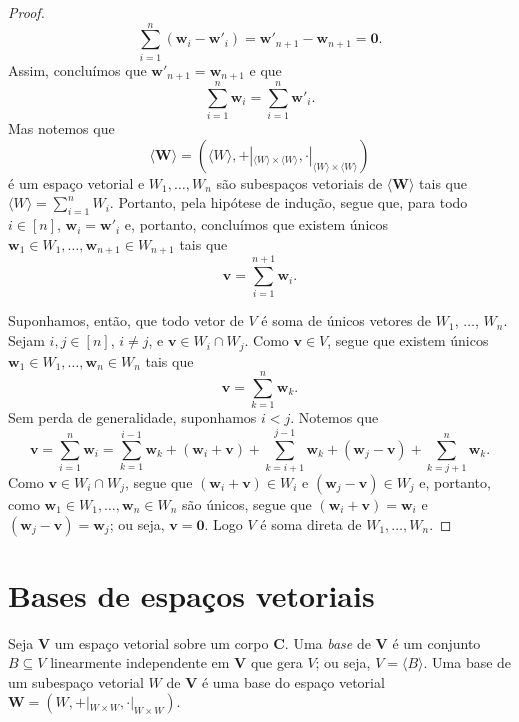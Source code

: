 \begin{proof}
\begin{equation*}
	\sum_{i=1}^n (\bm w_i - \bm w'_i) = \bm w'_{n+1} - \bm w_{n+1} = \bm 0.
	\end{equation*}
Assim, concluímos que $\bm w'_{n+1}=\bm w_{n+1}$ e que
	\begin{equation*}
	\sum_{i=1}^n \bm w_i = \sum_{i=1}^n \bm w'_i.
	\end{equation*}
Mas notemos que
	\begin{equation*}
	\bm{\langle W \rangle}=(\langle W \rangle,+|_{\langle W \rangle \times \langle W \rangle},\cdot|_{\langle W \rangle \times \langle W \rangle})
	\end{equation*}
é um espaço vetorial e $W_1,\ldots,W_n$ são subespaços vetoriais de $\bm{\langle W \rangle}$ tais que $\langle W \rangle=\displaystyle\sum_{i=1}^n W_i$. Portanto, pela hipótese de indução, segue que, para todo $i \in [n]$, $\bm w_i = \bm w'_i$ e, portanto, concluímos que existem únicos $\bm w_1 \in W_1,\ldots,\bm w_{n+1} \in W_{n+1}$ tais que
	\begin{equation*}
	\bm v = \sum_{i=1}^{n+1} \bm w_i.
	\end{equation*}

	Suponhamos, então, que todo vetor de $V$ é soma de únicos vetores de $W_1$, $\ldots$, $W_n$. Sejam $i,j \in [n]$, $i \neq j$, e $\bm v \in W_i \cap W_j$. Como $\bm v \in V$, segue que existem únicos $\bm w_1 \in W_1, \ldots, \bm w_n \in W_n$ tais que
	\begin{equation*}
	\bm v = \sum_{k=1}^n \bm w_k.
	\end{equation*}
Sem perda de generalidade, suponhamos $i<j$. Notemos que
	\begin{equation*}
	\bm v = \sum_{i=1}^n \bm w_i = \sum_{k=1}^{i-1} \bm w_k + (\bm w_i+\bm v) +  \sum_{k=i+1}^{j-1} \bm w_k + (\bm w_j - \bm v) + \sum_{k=j+1}^n \bm w_k.
	\end{equation*}
Como $\bm v \in W_i \cap W_j$, segue que $(\bm w_i+\bm v) \in W_i$ e $(\bm w_j - \bm v) \in W_j$ e, portanto, como $\bm w_1 \in W_1, \ldots, \bm w_n \in W_n$ são únicos, segue que $(\bm w_i+\bm v) = \bm w_i$ e $(\bm w_j - \bm v) = \bm w_j$; ou seja, $\bm v = \bm 0$. Logo $V$ é soma direta de $W_1,\ldots,W_n$.
\end{proof}


\section{Bases de espaços vetoriais}

\begin{definition}
	Seja $\bm V$ um espaço vetorial sobre um corpo $\bm C$. Uma \emph{base} de $\bm V$ é um conjunto $B \subseteq V$ linearmente independente em $\bm V$ que gera $V$; ou seja, $V=\langle B \rangle$. Uma base de um subespaço vetorial $W$ de $\bm V$ é uma base do espaço vetorial $\bm W=(W,+|_{W \times W},\cdot|_{W \times W})$.
\end{definition}

